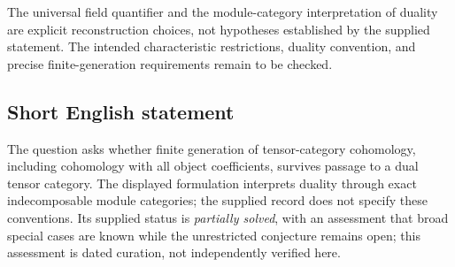 \documentclass[11pt]{article}
\begin{document}
The universal field quantifier and the module-category interpretation of duality are explicit reconstruction choices, not hypotheses established by the supplied statement. The intended characteristic restrictions, duality convention, and precise finite-generation requirements remain to be checked.
\subsection{Short English statement}
The question asks whether finite generation of tensor-category cohomology, including cohomology with all object coefficients, survives passage to a dual tensor category. The displayed formulation interprets duality through exact indecomposable module categories; the supplied record does not specify these conventions. Its supplied status is \emph{partially solved}, with an assessment that broad special cases are known while the unrestricted conjecture remains open; this assessment is dated curation, not independently verified here.
\end{document}
